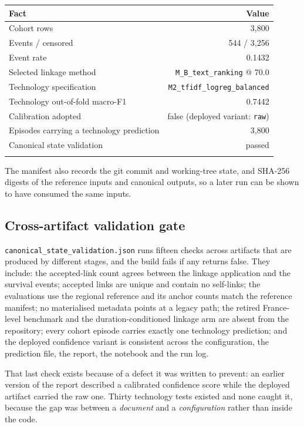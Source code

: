 \begin{longtable}[]{@{}lr@{}}
\toprule\noalign{}
Fact & Value \\
\midrule\noalign{}
\endhead
Cohort rows & 3,800 \\
Events / censored & 544 / 3,256 \\
Event rate & 0.1432 \\
Selected linkage method & \texttt{M\_B\_text\_ranking} @ 70.0 \\
Technology specification & \texttt{M2\_tfidf\_logreg\_balanced} \\
Technology out-of-fold macro-F1 & 0.7442 \\
Calibration adopted & false (deployed variant: \texttt{raw}) \\
Episodes carrying a technology prediction & 3,800 \\
Canonical state validation & passed \\
\bottomrule\noalign{}
\end{longtable}

The manifest also records the git commit and working-tree state, and SHA-256 digests of the reference inputs
and canonical outputs, so a later run can be shown to have consumed the same inputs.

\subsection*{Cross-artifact validation gate}

\texttt{canonical\_state\_validation.json} runs fifteen checks across artifacts that are produced by different
stages, and the build fails if any returns false. They include: the accepted-link count agrees between the
linkage application and the survival events; accepted links are unique and contain no self-links; the
evaluations use the regional reference and its anchor counts match the reference manifest; no materialised
metadata points at a legacy path; the retired France-level benchmark and the duration-conditioned linkage arm
are absent from the repository; every cohort episode carries exactly one technology prediction; and the
deployed confidence variant is consistent across the configuration, the prediction file, the report, the
notebook and the run log.

That last check exists because of a defect it was written to prevent: an earlier version of the report
described a calibrated confidence score while the deployed artifact carried the raw one. Thirty technology
tests existed and none caught it, because the gap was between a \emph{document} and a \emph{configuration}
rather than inside the code.

